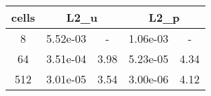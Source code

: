 \documentclass[10pt]{report}
\begin{document}
\begin{table}[H]
\begin{center}
\begin{tabular}{|c|c|c|c|c|} \hline
cells & 
\multicolumn{2}{|c|}{L2_u} & 
\multicolumn{2}{|c|}{L2_p}\\ \hline
8 & 5.52e-03 & - & 1.06e-03 & -\\ \hline
64 & 3.51e-04 & 3.98 & 5.23e-05 & 4.34\\ \hline
512 & 3.01e-05 & 3.54 & 3.00e-06 & 4.12\\ \hline
\end{tabular}
\end{center}
\end{table}
\end{document}
